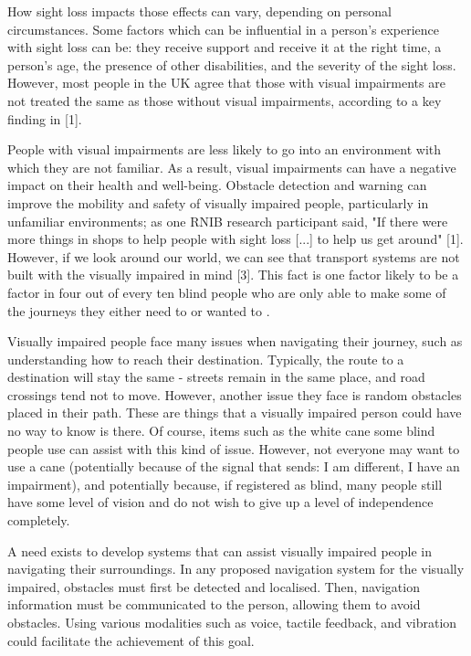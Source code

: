 \documentclass[conference]{IEEEtran}
\begin{document}
How sight loss impacts those effects can vary, depending on personal circumstances. Some factors which can be influential in a person's experience with sight loss can be: they receive support and receive it at the right time, a person's age, the presence of other disabilities, and the severity of the sight loss. However, most people in the UK agree that those with visual impairments are not treated the same as those without visual impairments, according to a key finding in [1].

People with visual impairments are less likely to go into an environment with which they are not familiar. As a result, visual impairments can have a negative impact on their health and well-being. Obstacle detection and warning can improve the mobility and safety of visually impaired people, particularly in unfamiliar environments; as one RNIB research participant said, "If there were more things in shops to help people with sight loss [...] to help us get around" [1]. However, if we look around our world, we can see that transport systems are not built with the visually impaired in mind [3]. This fact is one factor likely to be a factor in four out of every ten blind people who are only able to make some of the journeys they either need to or wanted to \cite{rnib}.

Visually impaired people face many issues when navigating their journey, such as understanding how to reach their destination. Typically, the route to a destination will stay the same - streets remain in the same place, and road crossings tend not to move. However, another issue they face is random obstacles placed in their path. These are things that a visually impaired person could have no way to know is there. Of course, items such as the white cane some blind people use can assist with this kind of issue. However, not everyone may want to use a cane (potentially because of the signal that sends: I am different, I have an impairment), and potentially because, if registered as blind, many people still have some level of vision and do not wish to give up a level of independence completely. 

A need exists to develop systems that can assist visually impaired people in navigating their surroundings. In any proposed navigation system for the visually impaired, obstacles must first be detected and localised. Then, navigation information must be communicated to the person, allowing them to avoid obstacles. Using various modalities such as voice, tactile feedback, and vibration could facilitate the achievement of this goal.
 
\end{document}
